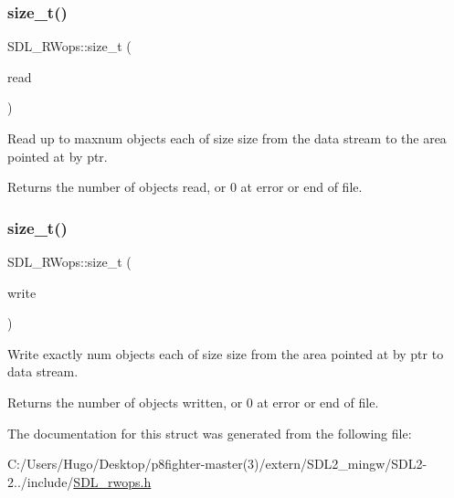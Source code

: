 \subsubsection{\texorpdfstring{size\+\_\+t()}{size\_t()}\hspace{0.1cm}{\footnotesize\ttfamily [1/2]}}
{\footnotesize\ttfamily S\+D\+L\+\_\+\+R\+Wops\+::size\+\_\+t (\begin{DoxyParamCaption}\item[{S\+D\+L\+C\+A\+LL $\ast$}]{read }\end{DoxyParamCaption})}

Read up to {\ttfamily maxnum} objects each of size {\ttfamily size} from the data stream to the area pointed at by {\ttfamily ptr}.

\begin{DoxyReturn}{Returns}
the number of objects read, or 0 at error or end of file. 
\end{DoxyReturn}
\mbox{\label{struct_s_d_l___r_wops_a5f12fd517afffba5bfaff4643d6792b1}} 
\subsubsection{\texorpdfstring{size\+\_\+t()}{size\_t()}\hspace{0.1cm}{\footnotesize\ttfamily [2/2]}}
{\footnotesize\ttfamily S\+D\+L\+\_\+\+R\+Wops\+::size\+\_\+t (\begin{DoxyParamCaption}\item[{S\+D\+L\+C\+A\+LL $\ast$}]{write }\end{DoxyParamCaption})}

Write exactly {\ttfamily num} objects each of size {\ttfamily size} from the area pointed at by {\ttfamily ptr} to data stream.

\begin{DoxyReturn}{Returns}
the number of objects written, or 0 at error or end of file. 
\end{DoxyReturn}


The documentation for this struct was generated from the following file\+:\begin{DoxyCompactItemize}
\item 
C\+:/\+Users/\+Hugo/\+Desktop/p8fighter-\/master(3)/extern/\+S\+D\+L2\+\_\+mingw/\+S\+D\+L2-\/2../include/\hyperlink{_s_d_l__rwops_8h}{S\+D\+L\+\_\+rwops.\+h}\end{DoxyCompactItemize}
